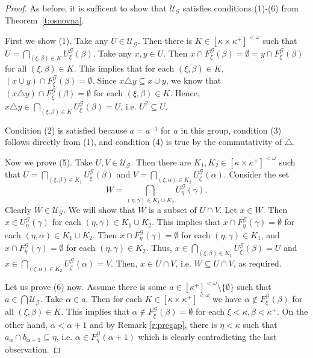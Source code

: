 \documentclass{amsart}
\theoremstyle{plain}
\theoremstyle{definition}
\numberwithin{equation}{section}
\renewcommand{\a}{\alpha}
\renewcommand{\b}{\beta}
\newcommand{\g}{\gamma}
\renewcommand{\k}{\kappa}
\renewcommand{\o}{\omega}
\newcommand{\ps}{\emptyset}
\newcommand{\sst}{\subseteq}
\newcommand{\cu}{\mathcal U}
\begin{document}
\begin{proof}
	As before, it is sufficent to show that $\cu_{\mathcal G}$ satisfies conditions (1)-(6) from Theorem~\ref{t:osnovna}.

	First we show (1).
	Take any $U \in \cu_{\mathcal G}$.
	Then there is $K \in [\k \times \k^+]^{<\o}$ such that $U = \bigcap_{(\xi,\b) \in K}U^{\mathcal G}_\xi(\b)$.
	Take any $x, y \in U$.
	Then $x \cap F^{\mathcal G}_\xi(\b) = \ps = y \cap F^{\mathcal G}_\xi(\b)$ for all $(\xi,\b) \in K$.
	This implies that for each $(\xi,\b) \in K$, $(x \cup y) \cap F^{\mathcal G}_\xi(\b) = \ps$.
	Since $x \triangle y \sst x \cup y$, we know that $(x\triangle y) \cap F^{\mathcal G}_\xi(\b) = \ps$ for each $(\xi,\b) \in K$.
	Hence, $x \triangle y \in \bigcap_{(\xi,\b) \in K}U^{\mathcal G}_\xi(\b) = U$, i.e. $U^2 \sst U$.
		
	Condition (2) is satisfied because $a=a^{-1}$ for $a$ in this group, condition (3) follows directly from (1), and condition (4) is true by the commutativity of $\triangle$.

	Now we prove (5).
	Take $U, V \in \cu_{\mathcal G}$.
	Then there are $K_1, K_2 \in [\k \times \k^+]^{<\o}$ such that
	$U = \bigcap_{(\xi,\b) \in K_1}U^{\mathcal G}_\xi(\b)$ and $V = \bigcap_{(\zeta,\a) \in K_2}U^{\mathcal G}_\zeta(\a)$.
	Consider the set $$\textstyle W = \bigcap_{(\eta, \g) \in K_1 \cup K_2}U^{\mathcal G}_\eta(\g).$$ 
	Clearly $W\in \cu_{\mathcal G}$.
	We will show that $W$ is a subset of $U \cap V$.	
	Let $x \in W$.
	Then $x \in U^{\mathcal G}_\eta(\g)$ for each $(\eta,\g) \in K_1 \cup K_2$.
	This implies that $x \cap F^{\mathcal G}_\eta(\g) = \ps$ for each $(\eta,\a) \in K_1 \cup K_2$.
	Then $x \cap F^{\mathcal G}_\eta(\g) = \ps$ for each $(\eta,\g) \in K_1$, and $x \cap F^{\mathcal G}_\eta(\g) =\ps$ for each $(\eta,\g) \in K_2$.
	Thus, $x \in \bigcap_{(\xi,\b) \in K_1}U^{\mathcal G}_\xi(\b) = U$ and $x \in \bigcap_{(\zeta,\a) \in K_2}U^{\mathcal G}_\zeta(\a) = V$.
	Then, $x \in U \cap V$, i.e. $W \sst U \cap V$, as required.

	Let us prove (6) now. Assume there is some $a \in [\k^+]^{<\o}\setminus\{\ps\}$ such that $a \in \bigcap\cu_{\mathcal G}$.
	Take $\a\in a$.
	Then for each $K \in [\k \times \k^+]^{<\o}$ we have $\a\notin F^{\mathcal G}_\xi(\b)$ for all $(\xi,\b) \in K$.
	This implies that $\a\notin F^{\mathcal G}_\xi(\b) = \ps$ for each $\xi < \k, \b < \k^+$.
	On the other hand, $\a < \a+1$ and by Remark \ref{r:pregap}, there is $\eta < \k$ such that $a_\a \cap b_{\a+1} \sst \eta$, i.e. $\a \in F^{\mathcal G}_\eta(\a+1)$ which is clearly contradicting the last observation.
\end{proof}
\end{document}
